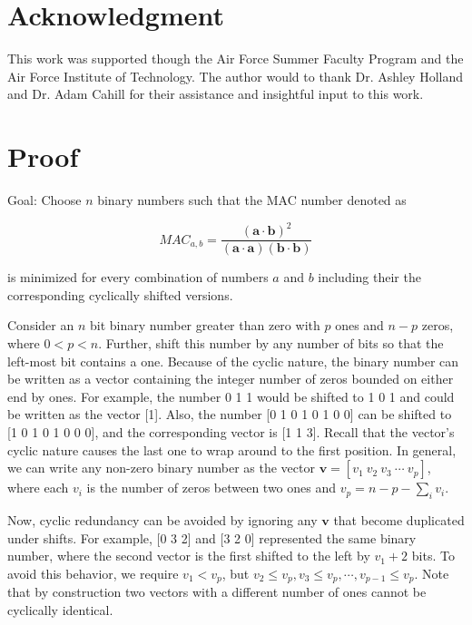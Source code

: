\documentclass[3p,times]{elsarticle}
\begin{document}
\section{Acknowledgment}
This work was supported though the Air Force Summer Faculty Program and the Air Force Institute of Technology.  
The author would to thank Dr. Ashley Holland and Dr. Adam Cahill for their assistance and insightful input to this work.

\appendix

\section{Proof}
Goal: Choose $n$ binary numbers such that the MAC number denoted as 

\begin{equation}
MAC_{a,b}=\frac{\left(\mathbf{a}\cdot\mathbf{b}\right)^2}{\left(\mathbf{a}\cdot\mathbf{a}\right)\left(\mathbf{b}\cdot\mathbf{b}\right)}
\end{equation}

is minimized for every combination of numbers $a$ and $b$ including their the corresponding cyclically shifted versions.

Consider an $n$ bit binary number greater than zero with $p$ ones and $n-p$ zeros, where $0<p<n$.  
Further, shift this number by any number of bits so that the left-most bit contains a one.  
Because of the cyclic nature, the binary number can be written as a vector containing the integer number of zeros bounded on either end by ones.  
For example, the number 0 1 1 would be shifted to 1 0 1 and could be written as the vector [1].  
Also, the number [0 1 0 1 0 1 0 0] can be shifted to [1 0 1 0 1 0 0 0], and the corresponding vector is [1 1 3].  
Recall that the vector's cyclic nature causes the last one to wrap around to the first 
position.  
In general, we can write any non-zero binary number as the vector $\textbf{v}=\left[v_1\ v_2\ v_3\ \cdots\ v_p\right]$, where each $v_i$ is the number of zeros between two ones and $v_p=n-p-\sum\limits_{i} v_i$.  

Now, cyclic redundancy can be avoided by ignoring any $\textbf{v}$ that become duplicated under shifts.  
For example, [0 3 2] and [3 2 0] represented the same binary number, where the second vector is the first shifted to the left by $v_1+2$ bits.  
To avoid this behavior, we require $v_{1}<v_p$, but $v_2\le v_p, v_3\le v_p, \cdots, v_{p-1}\le v_p$.  
Note that by construction two vectors with a different number of ones cannot be cyclically identical.
\end{document}
